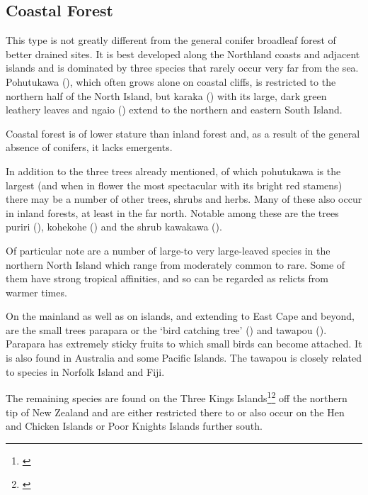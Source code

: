 \subsection{Coastal Forest}

This type is not greatly different from the general conifer broadleaf forest of better drained sites.
It is best developed along the Northland coasts and adjacent islands and is dominated by three species that rarely occur very far from the sea.
Pohutukawa (), which often grows alone on coastal cliffs, is restricted to the northern half of the North Island, but karaka () with its large, dark green leathery leaves and ngaio () extend to the northern and eastern South Island.

Coastal forest is of lower stature than inland forest and, as a result of the general absence of conifers, it lacks emergents.

In addition to the three trees already mentioned, of which pohutukawa is the largest (and when in flower the most spectacular with its bright red stamens) there may be a number of other trees, shrubs and herbs.
Many of these also occur in inland forests, at least in the far north.
Notable among these are the trees puriri (), kohekohe () and the shrub kawakawa ().

Of particular note are a number of large-to very large-leaved species in the northern North Island which range from moderately common to rare.
Some of them have strong tropical affinities, and so can be regarded as relicts from warmer times.

On the mainland as well as on islands, and extending to East Cape and beyond, are the small trees parapara or the `bird catching tree' () and tawapou ().
Parapara has extremely sticky fruits to which small birds can become attached.
It is also found in Australia and some Pacific Islands.
The tawapou is closely related to species in Norfolk Island and Fiji.

The remaining species are found on the Three Kings Islands\footnote{\cite{baylis1948vegetation}}\footnote{\cite{oliver1948flora}} off the northern tip of New Zealand and are either restricted there to or also occur on the Hen and Chicken Islands or Poor Knights Islands further south.

